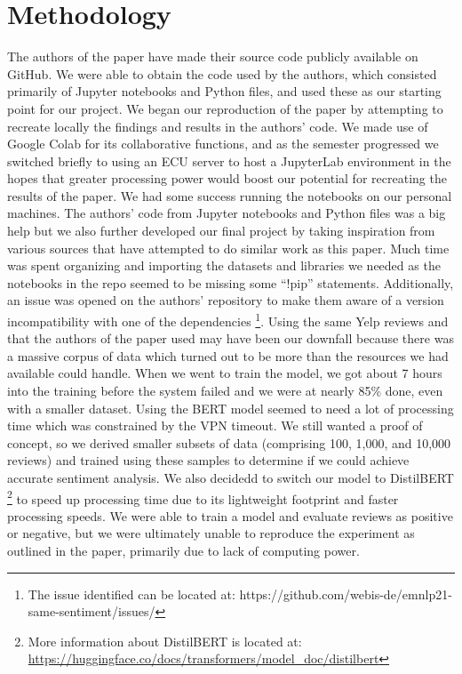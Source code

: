 \documentclass[conference]{IEEEtran}
\begin{document}
\section{Methodology}
	The authors of the paper have made their source code publicly available on GitHub. We were able to obtain the code used by the authors, which consisted primarily of Jupyter notebooks and Python files, and used these as our starting point for our project.
	We began our reproduction of the paper by attempting to recreate locally the findings and results in the authors’ code. We made use of Google Colab for its collaborative functions, and as the semester progressed we switched briefly to using an ECU server to host a JupyterLab environment in the hopes that greater processing power would boost our potential for recreating the results of the paper. We had some success running the notebooks on our personal machines.
	The authors’ code from Jupyter notebooks and Python files was a big help but we also further developed our final project by taking inspiration from various sources that have attempted to do similar work as this paper. Much time was spent organizing and importing the datasets and libraries we needed as the notebooks in the repo seemed to be missing some “!pip” statements. Additionally, an issue was opened on the authors’ repository to make them aware of a version incompatibility with one of the dependencies 
\footnote{The issue identified can be located at: https://github.com/webis-de/emnlp21-same-sentiment/issues/}.
	Using the same Yelp reviews and that the authors of the paper used may have been our downfall because there was a massive corpus of data which turned out to be more than the resources we had available could handle.  When we went to train the model, we got about 7 hours into the training before the system failed and we were at nearly 85\% done, even with a smaller dataset. Using the BERT model seemed to need a lot of processing time which was constrained by the VPN timeout.  
	We still wanted a proof of concept, so we derived smaller subsets of data (comprising 100, 1,000, and 10,000 reviews) and trained using these samples to determine if we could achieve accurate sentiment analysis. We also decidedd to switch our model to DistilBERT
\footnote{More information about DistilBERT is located at: \url{https://huggingface.co/docs/transformers/model_doc/distilbert}} to speed up processing time due to its lightweight footprint and faster processing speeds.  We were able to train a model and evaluate reviews as positive or negative, but we were ultimately unable to reproduce the experiment as outlined in the paper, primarily due to lack of computing power.
\end{document}
